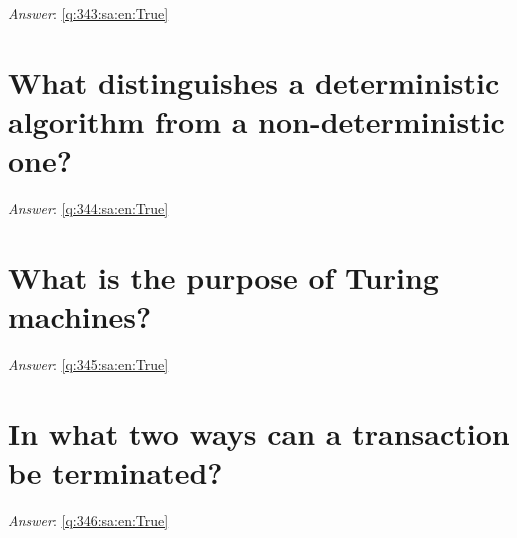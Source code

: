 \documentclass[a4paper,11pt,oneside]{book}
\begin{document}
\begin{sloppypar}
\label{q:343:sa:en:False}

\vspace{2cm}

\noindent\makebox[\textwidth]{\hrulefill}

\vspace{1cm}

\textit{Answer}: \autoref{q:343:sa:en:True}



\section{What distinguishes a deterministic algorithm from a non-deterministic one?}

\label{q:344:sa:en:False}

\vspace{2cm}

\noindent\makebox[\textwidth]{\hrulefill}

\vspace{1cm}

\textit{Answer}: \autoref{q:344:sa:en:True}



\section{What is the purpose of Turing machines?}

\label{q:345:sa:en:False}

\vspace{2cm}

\noindent\makebox[\textwidth]{\hrulefill}

\vspace{1cm}

\textit{Answer}: \autoref{q:345:sa:en:True}



\section{In what two ways can a transaction be terminated?}

\label{q:346:sa:en:False}

\vspace{2cm}

\noindent\makebox[\textwidth]{\hrulefill}

\vspace{1cm}

\textit{Answer}: \autoref{q:346:sa:en:True}






















\end{sloppypar}
\end{document}
